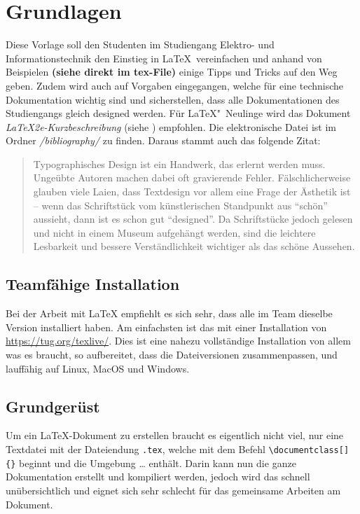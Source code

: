 \section{Grundlagen}
Diese Vorlage soll den Studenten im Studiengang Elektro- und Informationstechnik den Einstieg in \LaTeX\ vereinfachen und anhand von Beispielen \textbf{(siehe direkt im tex-File)} einige Tipps und Tricks auf den Weg geben. Zudem wird auch auf Vorgaben eingegangen, welche für eine technische Dokumentation wichtig sind und sicherstellen, dass alle Dokumentationen des Studiengangs gleich designed werden. Für \LaTeX "~Neulinge wird das Dokument \emph{LaTeX2e-Kurzbeschreibung} (siehe \cite{l2kurz}) empfohlen.  Die elektronische Datei ist im Ordner \mbox{\emph{/bibliography/}} zu finden. Daraus stammt auch das folgende Zitat:
\begin{quote}
Typographisches Design ist ein Handwerk, das erlernt werden muss. Ungeübte Autoren machen dabei oft gravierende Fehler. Fälschlicherweise glauben viele Laien, dass Textdesign vor allem eine Frage der Ästhetik ist -- wenn das Schriftstück vom künstlerischen Standpunkt aus \enquote{schön} aussieht, dann ist es schon gut \enquote{designed}. Da Schriftstücke jedoch gelesen und nicht in einem Museum aufgehängt werden, sind die leichtere Lesbarkeit und bessere Verständlichkeit wichtiger als das schöne Aussehen. \cite{l2kurz}
\end{quote}

\subsection{Teamfähige Installation}

Bei der Arbeit mit \LaTeX{} empfiehlt es sich sehr, dass alle im Team dieselbe Version installiert haben.  Am einfachsten ist das mit einer Installation von \url{https://tug.org/texlive/}.  Dies ist eine nahezu vollständige Installation von allem was es braucht, so aufbereitet, dass die Dateiversionen zusammenpassen, und lauffähig auf Linux, MacOS und Windows.

\subsection{Grundgerüst}
Um ein \LaTeX-Dokument zu erstellen braucht es eigentlich nicht viel, nur eine Textdatei mit der Dateiendung \texttt{.tex}, welche mit dem Befehl \verb|\documentclass[]{}| beginnt und die Umgebung \verb|| \dots \verb|| enthält.
Darin kann nun die ganze Dokumentation erstellt und kompiliert werden, jedoch wird das schnell unübersichtlich und eignet sich sehr schlecht für das gemeinsame Arbeiten am Dokument.

